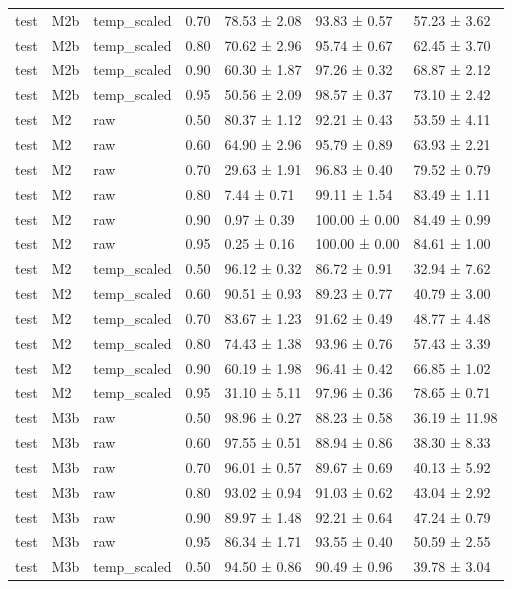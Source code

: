 \begin{tabular}{lllrlll}
test & M2b & temp\_scaled & 0.70 & 78.53 ± 2.08 & 93.83 ± 0.57 & 57.23 ± 3.62 \\
test & M2b & temp\_scaled & 0.80 & 70.62 ± 2.96 & 95.74 ± 0.67 & 62.45 ± 3.70 \\
test & M2b & temp\_scaled & 0.90 & 60.30 ± 1.87 & 97.26 ± 0.32 & 68.87 ± 2.12 \\
test & M2b & temp\_scaled & 0.95 & 50.56 ± 2.09 & 98.57 ± 0.37 & 73.10 ± 2.42 \\
test & M2 & raw & 0.50 & 80.37 ± 1.12 & 92.21 ± 0.43 & 53.59 ± 4.11 \\
test & M2 & raw & 0.60 & 64.90 ± 2.96 & 95.79 ± 0.89 & 63.93 ± 2.21 \\
test & M2 & raw & 0.70 & 29.63 ± 1.91 & 96.83 ± 0.40 & 79.52 ± 0.79 \\
test & M2 & raw & 0.80 & 7.44 ± 0.71 & 99.11 ± 1.54 & 83.49 ± 1.11 \\
test & M2 & raw & 0.90 & 0.97 ± 0.39 & 100.00 ± 0.00 & 84.49 ± 0.99 \\
test & M2 & raw & 0.95 & 0.25 ± 0.16 & 100.00 ± 0.00 & 84.61 ± 1.00 \\
test & M2 & temp\_scaled & 0.50 & 96.12 ± 0.32 & 86.72 ± 0.91 & 32.94 ± 7.62 \\
test & M2 & temp\_scaled & 0.60 & 90.51 ± 0.93 & 89.23 ± 0.77 & 40.79 ± 3.00 \\
test & M2 & temp\_scaled & 0.70 & 83.67 ± 1.23 & 91.62 ± 0.49 & 48.77 ± 4.48 \\
test & M2 & temp\_scaled & 0.80 & 74.43 ± 1.38 & 93.96 ± 0.76 & 57.43 ± 3.39 \\
test & M2 & temp\_scaled & 0.90 & 60.19 ± 1.98 & 96.41 ± 0.42 & 66.85 ± 1.02 \\
test & M2 & temp\_scaled & 0.95 & 31.10 ± 5.11 & 97.96 ± 0.36 & 78.65 ± 0.71 \\
test & M3b & raw & 0.50 & 98.96 ± 0.27 & 88.23 ± 0.58 & 36.19 ± 11.98 \\
test & M3b & raw & 0.60 & 97.55 ± 0.51 & 88.94 ± 0.86 & 38.30 ± 8.33 \\
test & M3b & raw & 0.70 & 96.01 ± 0.57 & 89.67 ± 0.69 & 40.13 ± 5.92 \\
test & M3b & raw & 0.80 & 93.02 ± 0.94 & 91.03 ± 0.62 & 43.04 ± 2.92 \\
test & M3b & raw & 0.90 & 89.97 ± 1.48 & 92.21 ± 0.64 & 47.24 ± 0.79 \\
test & M3b & raw & 0.95 & 86.34 ± 1.71 & 93.55 ± 0.40 & 50.59 ± 2.55 \\
test & M3b & temp\_scaled & 0.50 & 94.50 ± 0.86 & 90.49 ± 0.96 & 39.78 ± 3.04 \\

\end{tabular}
